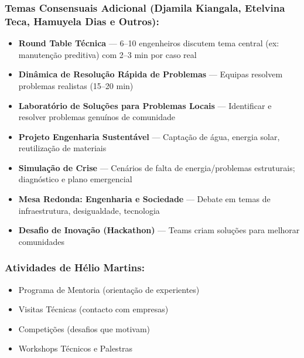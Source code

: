 \documentclass[12pt,a4paper]{article}
\begin{document}
\subsubsection*{Temas Consensuais Adicional (Djamila Kiangala, Etelvina Teca, Hamuyela Dias e Outros):}

\begin{itemize}[itemsep=0.2cm]
    \item \textbf{Round Table Técnica} — 6–10 engenheiros discutem tema central (ex: manutenção preditiva) com 2–3 min por caso real
    
    \item \textbf{Dinâmica de Resolução Rápida de Problemas} — Equipas resolvem problemas realistas (15–20 min)
    
    \item \textbf{Laboratório de Soluções para Problemas Locais} — Identificar e resolver problemas genuínos de comunidade
    
    \item \textbf{Projeto Engenharia Sustentável} — Captação de água, energia solar, reutilização de materiais
    
    \item \textbf{Simulação de Crise} — Cenários de falta de energia/problemas estruturais; diagnóstico e plano emergencial
    
    \item \textbf{Mesa Redonda: Engenharia e Sociedade} — Debate em temas de infraestrutura, desigualdade, tecnologia
    
    \item \textbf{Desafio de Inovação (Hackathon)} — Teams criam soluções para melhorar comunidades
\end{itemize}

\subsubsection*{Atividades de Hélio Martins:}

\begin{itemize}[itemsep=0.15cm]
    \item Programa de Mentoria (orientação de experientes)
    \item Visitas Técnicas (contacto com empresas)
    \item Competições (desafios que motivam)
    \item Workshops Técnicos e Palestras
\end{itemize}
\end{document}
